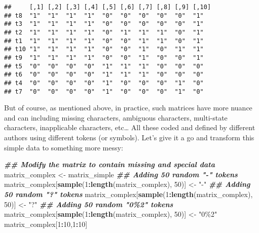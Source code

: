 \documentclass[
]{book}
\newenvironment{Shaded}{\begin{snugshade}}{\end{snugshade}}
\newcommand{\DecValTok}[1]{\textcolor[rgb]{0.00,0.00,0.81}{#1}}
\newcommand{\DocumentationTok}[1]{\textcolor[rgb]{0.56,0.35,0.01}{\textbf{\textit{#1}}}}
\newcommand{\FunctionTok}[1]{\textcolor[rgb]{0.13,0.29,0.53}{\textbf{#1}}}
\newcommand{\NormalTok}[1]{#1}
\newcommand{\OtherTok}[1]{\textcolor[rgb]{0.56,0.35,0.01}{#1}}
\newcommand{\SpecialCharTok}[1]{\textcolor[rgb]{0.81,0.36,0.00}{\textbf{#1}}}
\newcommand{\StringTok}[1]{\textcolor[rgb]{0.31,0.60,0.02}{#1}}
\begin{document}
\begin{verbatim}
##     [,1] [,2] [,3] [,4] [,5] [,6] [,7] [,8] [,9] [,10]
## t8  "1"  "1"  "1"  "1"  "0"  "0"  "0"  "0"  "0"  "1"  
## t3  "1"  "1"  "1"  "1"  "0"  "0"  "0"  "0"  "0"  "1"  
## t2  "1"  "1"  "1"  "1"  "0"  "1"  "1"  "1"  "0"  "1"  
## t1  "1"  "1"  "1"  "1"  "0"  "0"  "1"  "1"  "0"  "1"  
## t10 "1"  "1"  "1"  "1"  "0"  "0"  "1"  "0"  "1"  "1"  
## t9  "1"  "1"  "1"  "1"  "0"  "0"  "1"  "0"  "0"  "1"  
## t5  "0"  "0"  "0"  "0"  "1"  "1"  "1"  "0"  "0"  "0"  
## t6  "0"  "0"  "0"  "0"  "1"  "1"  "1"  "0"  "0"  "0"  
## t4  "0"  "0"  "0"  "0"  "1"  "0"  "0"  "0"  "1"  "0"  
## t7  "0"  "0"  "0"  "0"  "1"  "0"  "0"  "0"  "1"  "0"
\end{verbatim}

But of course, as mentioned above, in practice, such matrices have more nuance and can including missing characters, ambiguous characters, multi-state characters, inapplicable characters, etc\ldots{}
All these coded and defined by different authors using different tokens (or symbols).
Let's give it a go and transform this simple data to something more messy:

\begin{Shaded}
\begin{Highlighting}[]
\DocumentationTok{\#\# Modify the matrix to contain missing and special data}
\NormalTok{matrix\_complex }\OtherTok{\textless{}{-}}\NormalTok{ matrix\_simple}
\DocumentationTok{\#\# Adding 50 random "{-}" tokens}
\NormalTok{matrix\_complex[}\FunctionTok{sample}\NormalTok{(}\DecValTok{1}\SpecialCharTok{:}\FunctionTok{length}\NormalTok{(matrix\_complex), }\DecValTok{50}\NormalTok{)] }\OtherTok{\textless{}{-}} \StringTok{"{-}"}
\DocumentationTok{\#\# Adding 50 random "?" tokens}
\NormalTok{matrix\_complex[}\FunctionTok{sample}\NormalTok{(}\DecValTok{1}\SpecialCharTok{:}\FunctionTok{length}\NormalTok{(matrix\_complex), }\DecValTok{50}\NormalTok{)] }\OtherTok{\textless{}{-}} \StringTok{"?"}
\DocumentationTok{\#\# Adding 50 random "0\%2" tokens}
\NormalTok{matrix\_complex[}\FunctionTok{sample}\NormalTok{(}\DecValTok{1}\SpecialCharTok{:}\FunctionTok{length}\NormalTok{(matrix\_complex), }\DecValTok{50}\NormalTok{)] }\OtherTok{\textless{}{-}} \StringTok{"0\%2"}
\NormalTok{matrix\_complex[}\DecValTok{1}\SpecialCharTok{:}\DecValTok{10}\NormalTok{,}\DecValTok{1}\SpecialCharTok{:}\DecValTok{10}\NormalTok{]}
\end{Highlighting}
\end{Shaded}
\end{document}
